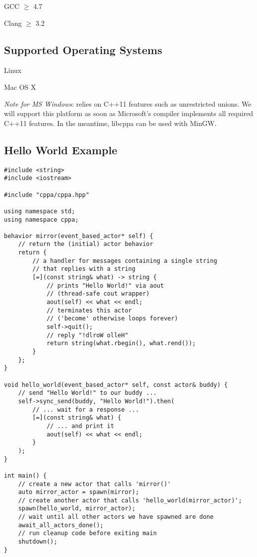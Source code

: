 \begin{itemize*}
  \item GCC $\ge$ 4.7
  \item Clang $\ge$ 3.2
\end{itemize*}

\subsection{Supported Operating Systems}

\begin{itemize*}
\item Linux
\item Mac OS X
\item \textit{Note for MS Windows}:
\libcppa relies on C++11 features such as unrestricted unions.
We will support this platform as soon as Microsoft's compiler implements all required C++11 features.
In the meantime, libcppa can be used with MinGW.
\end{itemize*}

\clearpage
\subsection{Hello World Example}

\begin{lstlisting}
#include <string>
#include <iostream>

#include "cppa/cppa.hpp"

using namespace std;
using namespace cppa;

behavior mirror(event_based_actor* self) {
    // return the (initial) actor behavior
    return {
        // a handler for messages containing a single string
        // that replies with a string
        [=](const string& what) -> string {
            // prints "Hello World!" via aout
            // (thread-safe cout wrapper)
            aout(self) << what << endl;
            // terminates this actor
            // ('become' otherwise loops forever)
            self->quit();
            // reply "!dlroW olleH"
            return string(what.rbegin(), what.rend());
        }
    };
}

void hello_world(event_based_actor* self, const actor& buddy) {
    // send "Hello World!" to our buddy ...
    self->sync_send(buddy, "Hello World!").then(
        // ... wait for a response ...
        [=](const string& what) {
            // ... and print it
            aout(self) << what << endl;
        }
    );
}

int main() {
    // create a new actor that calls 'mirror()'
    auto mirror_actor = spawn(mirror);
    // create another actor that calls 'hello_world(mirror_actor)';
    spawn(hello_world, mirror_actor);
    // wait until all other actors we have spawned are done
    await_all_actors_done();
    // run cleanup code before exiting main
    shutdown();
}
\end{lstlisting}
